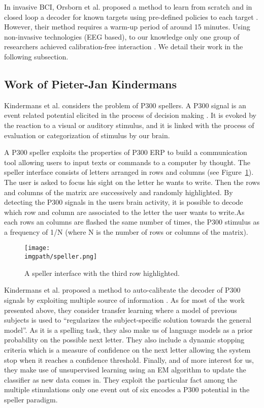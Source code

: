 In invasive BCI, Orsborn et al. proposed a method to learn from scratch and in closed loop a decoder for known targets using pre-defined policies to each target \cite{Orsborn2012}
. However, their method requires a warm-up period of around 15 minutes. Using non-invasive technologies (EEG based), to our knowledge only one group of researchers achieved calibration-free interaction \cite{kindermans2014true}. We detail their work in the following subsection.

\subsection{Work of Pieter-Jan Kindermans}

Kindermans et al. considers the problem of P300 spellers. A P300 signal is an event related potential elicited in the process of decision making \cite{polich2003theoretical}. It is evoked by the reaction to a visual or auditory stimulus, and it is linked with the process of evaluation or categorization of stimulus by our brain. 

A P300 speller exploits the properties of P300 ERP to build a communication tool allowing users to input texts or commands to a computer by thought. The speller interface consists of letters arranged in rows and columns (see Figure~\ref{fig:speller}). The user is asked to focus his sight on the letter he wants to write. Then the rows and columns of the matrix are successively and randomly highlighted. By detecting the P300 signals in the users brain activity, it is possible to decode which row and column are associated to the letter the user wants to write.As each rows an columns are flashed the same number of times, the P300 stimulus as a frequency of 1/N (where N is the number of rows or columns of the matrix).

\begin{figure}[!htbp]
  \centering
  \texttt{[image: \\imgpath/speller.png]}
  \caption{A speller interface with the third row highlighted.}
  \label{fig:speller}
\end{figure}

Kindermans et al. proposed a method to auto-calibrate the decoder of P300 signals by exploiting multiple source of information \cite{kindermans2014integrating}. As for most of the work presented above, they consider transfer learning where a model of previous subjects is used to ``regularizes the subject-specific solution towards the general model''. As it is a spelling task, they also make us of language models as a prior probability on the possible next letter. They also include a dynamic stopping criteria which is a measure of confidence on the next letter allowing the system stop when it reaches a confidence threshold. Finally, and of more interest for us, they make use of unsupervised learning using an EM algorithm to update the classifier as new data comes in. They exploit the particular fact among the multiple stimulations only one event out of six encodes a P300 potential in the speller paradigm.

